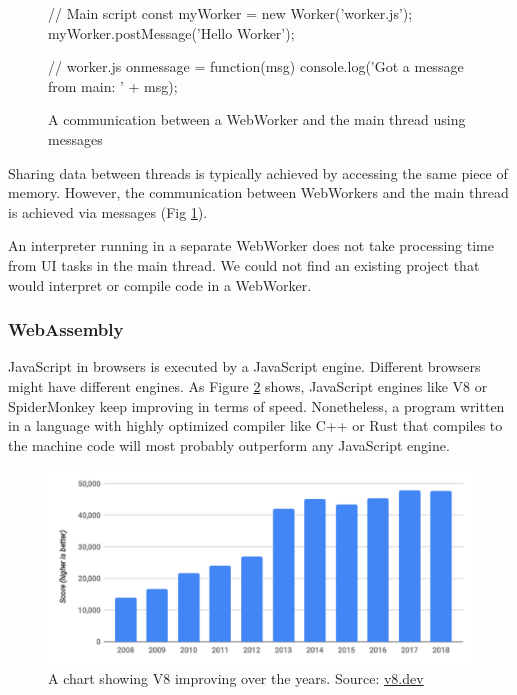 \begin{figure}[hbt]
\begin{code}
// Main script
const myWorker = new Worker('worker.js');
myWorker.postMessage('Hello Worker');

// worker.js
onmessage = function(msg) {
    console.log('Got a message from main: ' + msg);
}
\end{code}
    \caption{A communication between a WebWorker and the main thread using messages}
    \label{fig:chap2:messages}
\end{figure}

Sharing data between threads is typically achieved by accessing the same piece of memory. However, the communication between WebWorkers and the main
thread is achieved via messages (Fig \ref{fig:chap2:messages}).

An interpreter running in a separate WebWorker does not take processing time from UI tasks in the main thread. We could not find an existing
project that would interpret or compile code in a WebWorker.

\subsubsection{WebAssembly}
JavaScript in browsers is executed by a JavaScript engine. Different browsers might have different engines. As Figure \ref{fig:chap2:v8_bench} shows,
JavaScript engines like V8 or SpiderMonkey keep improving in terms of speed. Nonetheless, a program written in a language
with highly optimized compiler like C++ or Rust that compiles to the machine code will most probably outperform any JavaScript engine.

\begin{figure}[!hbt]
	\includegraphics[width=\textwidth]{../img/v8-bench}
	\caption{A chart showing V8 improving over the years. Source: \href{https://v8.dev/blog/10-years}{v8.dev}}
	\label{fig:chap2:v8_bench}
\end{figure}

